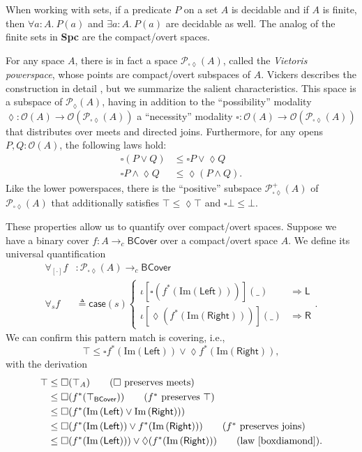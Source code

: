 \documentclass[conference]{IEEEtran}
\newcommand{\PLower}{\mathcal{P}_\lozenge}
\newcommand{\Viet}{\mathcal{P}_{\square\lozenge}}
\newcommand{\cto}{\to_c}
\newcommand{\Open}[1]{\mathcal{O}({#1})}
\newcommand{\wildcard}{\_}
\newcommand{\Img}[1]{\text{Im}\left({#1}\right)}
\newcommand{\oinclf}[1]{\iota[{#1}]}
\newcommand{\oincl}[2]{\oinclf{#1} \left({#2}\right)}
\newcommand{\Branch}{\Rightarrow}
\newcommand{\BCover}{\mathsf{BCover}}
\newcommand{\iimg}[1]{#1^*}
\begin{document}
When working with sets, if a predicate $P$ on a set $A$ is decidable and if $A$ is finite, then $\forall a : A.\ P(a)$ and $\exists a : A.\ P(a)$ are decidable as well. The analog of the finite sets in \textbf{Spc} are the compact/overt spaces.

For any space $A$, there is in fact a space $\Viet(A)$, called the \emph{Vietoris powerspace}, whose points are compact/overt subspaces of $A$. Vickers describes the construction in detail \cite{vickersconnected, vickersdoublepowerlocale}, but we summarize the salient characteristics. This space is a subspace of $\PLower(A)$, having in addition to the ``possibility'' modality $\lozenge : \Open{A} \to \Open{\Viet(A)}$ a ``necessity'' modality $\square : \Open{A} \to \Open{\Viet(A)}$ that distributes over meets and directed joins. Furthermore, for any opens $P, Q : \Open{A}$, the following laws hold:
\begin{align}
\label{boxdiamond}
\square (P \vee Q) &\le \square P \vee \lozenge Q
\\  \square P \wedge \lozenge Q &\le \lozenge (P \wedge Q).
\end{align}
Like the lower powerspaces, there is the ``positive'' subspace $\Viet^+(A)$ of $\Viet(A)$ that additionally satisfies $\top \le \lozenge \top$ and $\square \bot \le \bot$.

These properties allow us to quantify over compact/overt spaces. Suppose we have a binary cover $f : A \cto \BCover$ over a compact/overt space $A$. We define its universal quantification
\begin{align*}
\forall_{[\cdot]} f &: \Viet(A) \cto \BCover
\\ \forall_s f &\triangleq \mathsf{case}(s)
\begin{cases}
\oincl{\square \left( \iimg{f}(\Img{\mathsf{Left}}) \right) }{\wildcard} &\Branch \mathsf{L}
\\ \oincl{\lozenge \left( \iimg{f}(\Img{\mathsf{Right}}) \right)}{\wildcard} &\Branch \mathsf{R}
\end{cases}.
\end{align*}
We can confirm this pattern match is covering, i.e.,
\[
\top \le \square \iimg{f}(\Img{\mathsf{Left}}) \vee \lozenge \iimg{f}(\Img{\mathsf{Right}}),
\]
with the derivation
\begin{align*}
\top 
  &\le \square (\top_A) \tag{$\square$ preserves meets}
\\ &\le \square (\iimg{f}(\top_\BCover)) \tag{$\iimg{f}$ preserves $\top$}
\\ &\le \square (\iimg{f}(\Img{\mathsf{Left}} \vee \Img{\mathsf{Right}}))
\\ &\le \square(\iimg{f}(\Img{\mathsf{Left}}) \vee \iimg{f}(\Img{\mathsf{Right}}))  \tag{$\iimg{f}$ preserves joins}
\\ &\le \square (\iimg{f}(\Img{\mathsf{Left}})) \vee \lozenge (\iimg{f}(\Img{\mathsf{Right}})) \tag{law \ref{boxdiamond}}.
\end{align*}
\end{document}
